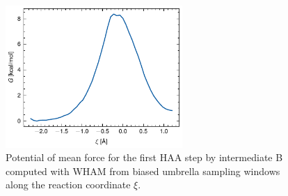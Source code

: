 \begin{figure}[htbp]
    \centering
    \includegraphics[width=0.6\textwidth]{Figures/PMF.pdf}
    \caption{Potential of mean force for the first HAA step by intermediate B computed with WHAM from biased umbrella sampling windows along the reaction coordinate $\xi$.}
    \label{fig:PMF}
\end{figure}